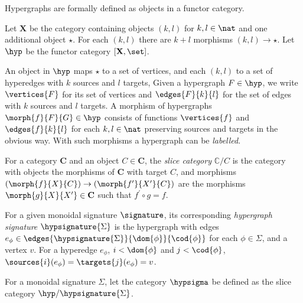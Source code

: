 Hypergraphs are formally defined as objects in a functor category.

\begin{definition}[Hypergraph]
    Let \(\mathbf{X}\) be the category containing objects \((k, l)\) for
    \(k, l \in \nat\) and one additional object \(\star\).
    For each \((k, l)\) there are \(k + l\) morphisms \((k, l) \to \star\).
    Let \(\hyp\) be the functor category \([\mathbf{X},\set]\).
\end{definition}

An object in \(\hyp\) maps \(\star\) to a set of vertices, and each \((k,l)\) to
a set of hyperedges with \(k\) sources and \(l\) targets,
Given a hypergraph \(F \in \hyp\), we write \(\vertices{F}\) for its set of
vertices and \(\edges{F}{k}{l}\) for the set of edges with \(k\) sources and
\(l\) targets.
A morphism of hypergraphs \(\morph{f}{F}{G} \in \hyp\) consists of functions
\(\vertices{f}\) and \(\edges{f}{k}{l}\) for each \(k,l \in \nat\) preserving
sources and targets in the obvious way.
With such morphisms a hypergraph can be \emph{labelled}.

\begin{definition}
    For a category \(\mathbf{C}\) and an object \(C \in \mathbf{C}\), the
    \emph{slice category} \(\mathbb{C} / C\) is the category with objects the
    morphisms of \(\mathbf{C}\) with target \(C\), and morphisms \(
        (\morph{f}{X}{C}) \to (\morph{f^\prime}{X^\prime}{C})
    \) are the morphisms \(\morph{g}{X}{X^\prime} \in \mathbf{C}\) such that
    \(f^\prime \circ g = f\).
\end{definition}


\begin{definition}
    For a given monoidal signature \(\signature\), its corresponding
    \emph{hypergraph signature} \(\hypsignature{\Sigma}\) is the hypergraph with
    edges \(
        e_\phi \in \edges{\hypsignature{\Sigma}}{\dom{\phi}}{\cod{\phi}}
    \) for each \(\phi \in \Sigma\), and a vertex \(v\).
    For a hyperedge \(e_\phi\), \(i < \dom{\phi}\) and \(j < \cod{\phi}\), \(
        \sources{i}(e_\phi) = \targets{j}(e_\phi) = v
    \).
\end{definition}

\begin{definition}
    For a monoidal signature \(\Sigma\), let the category \(\hypsigma\) be
    defined as the slice category \(\hyp / \hypsignature{\Sigma}\).
\end{definition}

